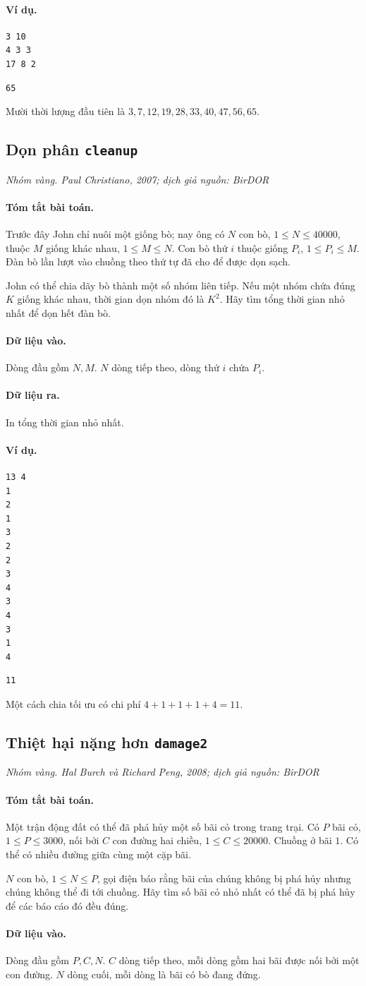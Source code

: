 \documentclass[11pt]{article}
\newcommand{\problem}[4]{%
  \subsection[#1 (#2)]{#1 \hfill {\normalsize\texttt{#2}}}%
  \noindent\textit{#3. #4}\par\smallskip
}
\newcommand{\iosec}[1]{\paragraph{#1}}
\begin{document}
\iosec{Ví dụ.}
\begin{verbatim}
3 10
4 3 3
17 8 2
\end{verbatim}

\begin{verbatim}
65
\end{verbatim}

Mười thời lượng đầu tiên là \(3,7,12,19,28,33,40,47,56,65\).

\problem{Dọn phân}{cleanup}{Nhóm vàng}{Paul Christiano, 2007; dịch giả nguồn: BirDOR}

\iosec{Tóm tắt bài toán.}
Trước đây John chỉ nuôi một giống bò; nay ông có \(N\) con bò,
\(1\le N\le 40000\), thuộc \(M\) giống khác nhau, \(1\le M\le N\). Con bò
thứ \(i\) thuộc giống \(P_i\), \(1\le P_i\le M\). Đàn bò lần lượt vào chuồng
theo thứ tự đã cho để được dọn sạch.

John có thể chia dãy bò thành một số nhóm liên tiếp. Nếu một nhóm chứa đúng
\(K\) giống khác nhau, thời gian dọn nhóm đó là \(K^2\). Hãy tìm tổng thời
gian nhỏ nhất để dọn hết đàn bò.

\iosec{Dữ liệu vào.}
Dòng đầu gồm \(N,M\). \(N\) dòng tiếp theo, dòng thứ \(i\) chứa \(P_i\).

\iosec{Dữ liệu ra.}
In tổng thời gian nhỏ nhất.

\iosec{Ví dụ.}
\begin{verbatim}
13 4
1
2
1
3
2
2
3
4
3
4
3
1
4
\end{verbatim}

\begin{verbatim}
11
\end{verbatim}

Một cách chia tối ưu có chi phí \(4+1+1+1+4=11\).

\problem{Thiệt hại nặng hơn}{damage2}{Nhóm vàng}{Hal Burch và Richard Peng, 2008; dịch giả nguồn: BirDOR}

\iosec{Tóm tắt bài toán.}
Một trận động đất có thể đã phá hủy một số bãi cỏ trong trang trại. Có
\(P\) bãi cỏ, \(1\le P\le 3000\), nối bởi \(C\) con đường hai chiều,
\(1\le C\le 20000\). Chuồng ở bãi \(1\). Có thể có nhiều đường giữa cùng một
cặp bãi.

\(N\) con bò, \(1\le N\le P\), gọi điện báo rằng bãi của chúng không bị phá
hủy nhưng chúng không thể đi tới chuồng. Hãy tìm số bãi cỏ nhỏ nhất có thể đã
bị phá hủy để các báo cáo đó đều đúng.

\iosec{Dữ liệu vào.}
Dòng đầu gồm \(P,C,N\). \(C\) dòng tiếp theo, mỗi dòng gồm hai bãi được nối
bởi một con đường. \(N\) dòng cuối, mỗi dòng là bãi có bò đang đứng.
\end{document}
